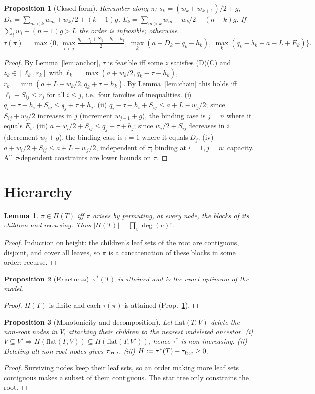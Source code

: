 \documentclass[11pt]{article}
\newtheorem{lemma}{Lemma}\newtheorem{proposition}{Proposition}\newtheorem{theorem}{Theorem}\newtheorem{corollary}{Corollary}
\theoremstyle{remark}\newtheorem{remark}{Remark}
\begin{document}
\begin{proposition}[Closed form]\label{prop:closed}
Renumber along $\pi$; $s_k=(w_k+w_{k+1})/2+g$, $D_k=\sum_{m<k}w_m+w_k/2+(k-1)g$, $E_k=\sum_{m>k}w_m+w_k/2+(n-k)g$. If $\sum_iw_i+(n-1)g>L$ the order is infeasible; otherwise
\[\tau(\pi)=\max\Big\{0,\ \max_{i<j}\tfrac{q_i-q_j+S_{ij}-h_i-h_j}{2},\ \max_k(a+D_k-q_k-h_k),\ \max_k(q_k-h_k-a-L+E_k)\Big\}.\]
\end{proposition}
\begin{proof}By Lemma~\ref{lem:anchor}, $\tau$ is feasible iff some $z$ satisfies (D)(C) and $z_k\in[\ell_k,r_k]$ with $\ell_k=\max(a+w_k/2,q_k-\tau-h_k)$, $r_k=\min(a+L-w_k/2,q_k+\tau+h_k)$. By Lemma~\ref{lem:chain} this holds iff $\ell_i+S_{ij}\le r_j$ for all $i\le j$, i.e.\ four families of inequalities.
(i) $q_i-\tau-h_i+S_{ij}\le q_j+\tau+h_j$.
(ii) $q_i-\tau-h_i+S_{ij}\le a+L-w_j/2$; since $S_{ij}+w_j/2$ increases in $j$ (increment $w_{j+1}+g$), the binding case is $j=n$ where it equals $E_i$.
(iii) $a+w_i/2+S_{ij}\le q_j+\tau+h_j$; since $w_i/2+S_{ij}$ decreases in $i$ (decrement $w_i+g$), the binding case is $i=1$ where it equals $D_j$.
(iv) $a+w_i/2+S_{ij}\le a+L-w_j/2$, independent of $\tau$; binding at $i=1,j=n$: capacity.
All $\tau$-dependent constraints are lower bounds on $\tau$.\end{proof}

\section{Hierarchy}
\begin{lemma}\label{lem:orders}$\pi\in\Pi(T)$ iff $\pi$ arises by permuting, at every node, the blocks of its children and recursing. Thus $|\Pi(T)|=\prod_v\deg(v)!$.\end{lemma}
\begin{proof}Induction on height: the children's leaf sets of the root are contiguous, disjoint, and cover all leaves, so $\pi$ is a concatenation of these blocks in some order; recurse.\end{proof}

\begin{proposition}[Exactness]$\tau^*(T)$ is attained and is the exact optimum of the model.\end{proposition}
\begin{proof}$\Pi(T)$ is finite and each $\tau(\pi)$ is attained (Prop.~\ref{prop:closed}).\end{proof}

\begin{proposition}[Monotonicity and decomposition]\label{prop:mono}
Let $\mathrm{flat}(T,V)$ delete the non-root nodes in $V$, attaching their children to the nearest undeleted ancestor. (i) $V\subseteq V'\Rightarrow\Pi(\mathrm{flat}(T,V))\subseteq\Pi(\mathrm{flat}(T,V'))$, hence $\tau^*$ is non-increasing. (ii) Deleting all non-root nodes gives $\tau_{\rm free}$. (iii) $H:=\tau^*(T)-\tau_{\rm free}\ge0$.
\end{proposition}
\begin{proof}Surviving nodes keep their leaf sets, so an order making more leaf sets contiguous makes a subset of them contiguous. The star tree only constrains the root.\end{proof}
\end{document}
